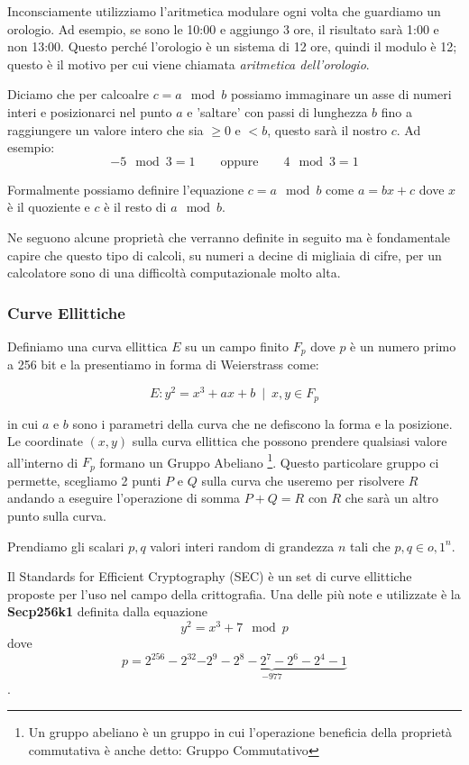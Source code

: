 \documentclass[12pt,a4paper]{article}
\begin{document}
Inconsciamente utilizziamo l'aritmetica modulare ogni volta che guardiamo un
orologio. Ad esempio, se sono le 10:00 e aggiungo 3 ore, il risultato sarà 1:00
e non 13:00. Questo perché l'orologio è un sistema di 12 ore, quindi il modulo è
12; questo è il motivo per cui viene chiamata \textit{aritmetica dell'orologio}.

Diciamo che per calcoalre $ c = a \mod{b} $ possiamo immaginare un asse di
numeri interi e posizionarci nel punto $ a $ e 'saltare' con passi di lunghezza $ b $
fino a raggiungere un valore intero che sia $ \ge 0 $ e $ < b $, questo sarà il
nostro $ c $. Ad esempio:
$$ -5 \mod{3} = 1 \qquad \text{oppure} \qquad 4 \mod 3 = 1 $$

Formalmente possiamo definire l'equazione $ c = a \mod{b} $ come $ a = bx + c $
dove $ x $ è il quoziente e $ c $ è il resto di $ a \mod b $.

Ne seguono alcune proprietà che verranno definite in seguito ma è fondamentale capire che questo tipo di calcoli, su numeri a decine di migliaia di cifre, per un calcolatore sono di una difficoltà computazionale molto alta.

\subsubsection*{Curve Ellittiche}
Definiamo una curva ellittica $ E $ su un campo finito $ F_p $ dove $ p $ è un
numero primo a 256 bit e la presentiamo in forma di Weierstrass come:

$$ E: y^2 = x^3 + ax + b \enspace | \enspace x, y \in F_p $$

in cui $ a $ e $ b $ sono i parametri della curva che ne defiscono la forma e la
posizione. Le coordinate $ (x,y) $ sulla curva ellittica che possono prendere
qualsiasi valore all'interno di $F_p$ formano un Gruppo Abeliano \footnote{Un
gruppo abeliano è un gruppo in cui l'operazione beneficia della proprietà
commutativa è anche detto: Gruppo Commutativo}. Questo particolare gruppo ci
permette, scegliamo 2 punti $ P $ e $ Q $ sulla curva che useremo per risolvere
$ R $ andando a eseguire l'operazione di somma $ P + Q = R $ con $ R $ che sarà
un altro punto sulla curva.

Prendiamo gli scalari $p, q$ valori interi random di grandezza $n$ tali che $ p,
q \in {o,1}^n $.

Il Standards for Efficient Cryptography (SEC) è un set di curve ellittiche
proposte per l'uso nel campo della crittografia. Una delle più note e utilizzate
è la \textbf{Secp256k1} definita dalla equazione
$$ y^2 = x^3 + 7 \mod{p} $$ dove 
$$ p = 2^{256} - 2^{32} \underbrace{- 2^9 - 2^8 - 2^7 - 2^6 - 2^4 - 1}_{-977}
$$.
\end{document}
